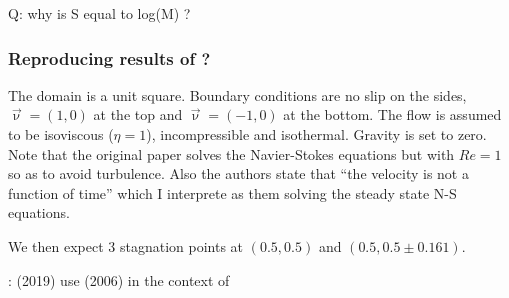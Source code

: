 Q: why is S equal to log(M) ?

\subsubsection*{Reproducing results of \textcite{cakm06}?}

The domain is a unit square. Boundary conditions are no slip on the sides, 
$\vec\upnu=(1,0)$ at the top and $\vec\upnu=(-1,0)$ at the bottom.
The flow is assumed to be isoviscous ($\eta=1$), incompressible and isothermal. 
Gravity is set to zero.
Note that the original paper \cite{cakm06} solves the Navier-Stokes equations but with $Re=1$
so as to avoid turbulence.
Also the authors state that ``the velocity is not a function of time'' which I interprete as 
them solving the steady state N-S equations. 

We then expect 3 stagnation points at $(0.5,0.5)$ and $(0.5,0.5\pm 0.161)$.


\Literature: \textcite{widd19} (2019) use \textcite{cakm06} (2006) in the context of 
